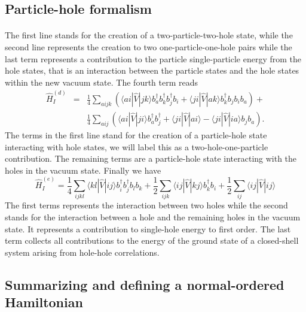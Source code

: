 \documentclass[%
twoside,                 %
final,                   %
10pt]{article}
\begin{document}
\subsection*{Particle-hole formalism}

\paragraph{}
The first line stands for the creation of a two-particle-two-hole state, while the second line represents
the creation to two one-particle-one-hole pairs
while the last term represents a contribution to the particle single-particle energy
from the hole states, that is an interaction between the particle states and the hole states
within the new vacuum  state.
The fourth term reads
\begin{eqnarray}
	 \hat{H}_I^{(d)}& = &\frac{1}{4} 
	 	\sum_{aijk}\left(\langle ai|\hat{V}|jk\rangle b_a^\dagger b_k^\dagger b_j^\dagger b_i+
\langle ji|\hat{V}|ak\rangle b_k^\dagger b_j b_i b_a\right)+\nonumber \\
&&\frac{1}{4}\sum_{aij}\left(\langle ai|\hat{V}|ji\rangle b_a^\dagger b_j^\dagger+
\langle ji|\hat{V}|ai\rangle - \langle ji|\hat{V}|ia\rangle b_j b_a \right). \label{eq:2-69d} 
\end{eqnarray}
The terms in the first line  stand for the creation of a particle-hole state 
interacting with hole states, we will label this as a two-hole-one-particle contribution. 
The remaining terms are a particle-hole state interacting with the holes in the vacuum state. 
Finally we have 
\begin{equation}
	\hat{H}_I^{(e)} = \frac{1}{4}
		 \sum_{ijkl}
		 \langle kl|\hat{V}|ij\rangle b_i^\dagger b_j^\dagger b_l b_k+
	        \frac{1}{2}\sum_{ijk}\langle ij|\hat{V}|kj\rangle b_k^\dagger b_i
	        +\frac{1}{2}\sum_{ij}\langle ij|\hat{V}|ij\rangle \label{eq:2-70d}
\end{equation}
The first terms represents the 
interaction between two holes while the second stands for the interaction between a hole and the remaining holes in the vacuum state.
It represents a contribution to single-hole energy  to first order.
The last term collects all contributions to the energy of the ground state of a closed-shell system arising
from hole-hole correlations.




\subsection*{Summarizing and defining a normal-ordered Hamiltonian}
\end{document}
